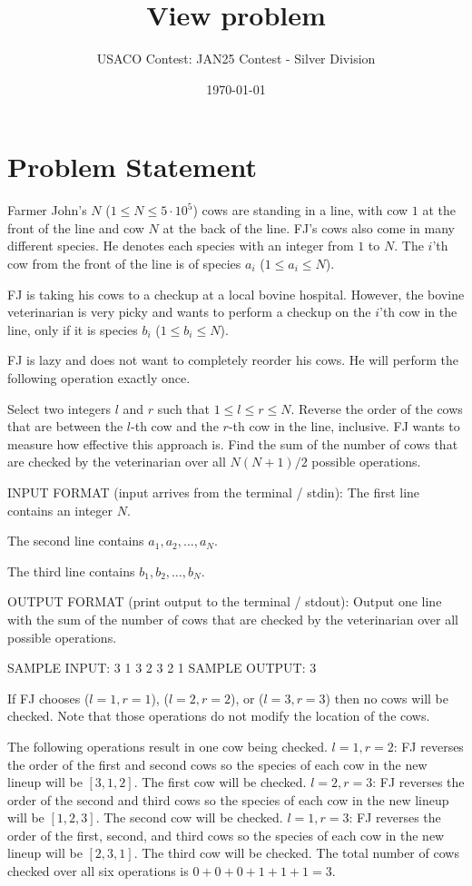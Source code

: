 \documentclass[12pt]{article}
\title{View problem}
\author{USACO Contest: JAN25 Contest - Silver Division}
\date{\today}
\begin{document}
\maketitle

\section*{Problem Statement}


Farmer John's $N$ ($1 \leq N \leq 5 \cdot 10^5$) cows are standing in a line,
with cow $1$ at the front of the line and cow $N$ at the back of the line. FJ's
cows also come in many different species. He denotes each species with an
integer from $1$ to $N$. The $i$'th cow from the front of the line is of species
$a_i$ ($1 \leq a_i \leq N$). 

FJ is taking his cows to a checkup at a local bovine hospital. However, the
bovine veterinarian is very picky and wants to perform a checkup on the $i$'th
cow in the line, only if it is species $b_i$ ($1 \leq b_i \leq N$). 

FJ is lazy and does not want to completely reorder his cows.  He will perform
the following operation exactly once.

 Select two integers $l$ and $r$ such that $1 \leq l \le r \leq N$. Reverse
the order of the cows that are between the $l$-th cow and the $r$-th cow in the
line, inclusive. 
FJ wants to measure how effective this approach is. Find the sum of the number
of cows  that are checked by the veterinarian over all $N(N+1)/2$ possible
operations.

INPUT FORMAT (input arrives from the terminal / stdin):
The first line contains an integer $N$.

The second line contains $a_1, a_2, \ldots, a_N$.

The third line contains $b_1, b_2, \ldots, b_N$.

OUTPUT FORMAT (print output to the terminal / stdout):
Output one line with the sum of the number of cows that are checked by the
veterinarian  over all possible operations.

SAMPLE INPUT:
3
1 3 2
3 2 1
SAMPLE OUTPUT: 
3

If FJ chooses ($l=1,r=1$), ($l=2,r=2$), or ($l=3,r=3$) then no cows will be
checked. Note that those operations do not modify the location of the cows.

The following operations result in one cow being checked.
$l=1,r=2$: FJ reverses the order of the first and second cows so the species
of each cow in the new lineup will be $[3,1,2]$. The first cow will be checked.
$l=2,r=3$: FJ reverses the order of the second and third cows so the species
of each cow in the new lineup will be $[1,2,3]$. The second cow will be checked.
$l=1,r=3$: FJ reverses the order of the first, second, and third cows so the
species of each cow in the new lineup will be $[2,3,1]$. The third cow will be
checked. 
The total number of cows checked over all six operations is $0+0+0+1+1+1=3$.
\end{document}
